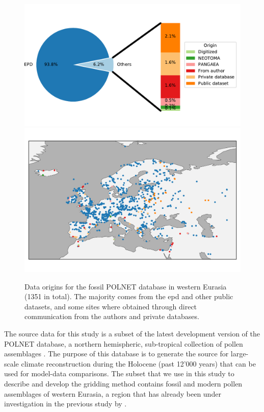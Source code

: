\begin{refsection}
\begin{figure}
	\includegraphics[width=\linewidth]{gridding-figures/origins.pdf} \\
	\includegraphics[width=\linewidth]{gridding-figures/sitelocs.pdf}
	\caption[Fossil Pollen Database]{Data origins for the fossil POLNET database in western Eurasia (1351 in total). The majority comes from the \gls{epd} and other public datasets, and some sites where obtained through direct communication from the authors and private databases.}
	\label{fig:gridding-fossil}
\end{figure}

The source data for this study is a subset of the latest development version of the POLNET database, a northern hemispheric, sub-tropical collection of pollen assemblages \citep{DavisKaplan2017, SommerDavisChevalierEtAl2019}. The purpose of this database is to generate the source for large-scale climate reconstruction during the Holocene (past 12'000 years) that can be used for model-data comparisons. The subset that we use in this study to describe and develop the gridding method contains fossil and modern pollen assemblages of western Eurasia, a region that has already been under investigation in the previous study by \cite{MauriDavisCollinsEtAl2015}. 


\end{refsection}
